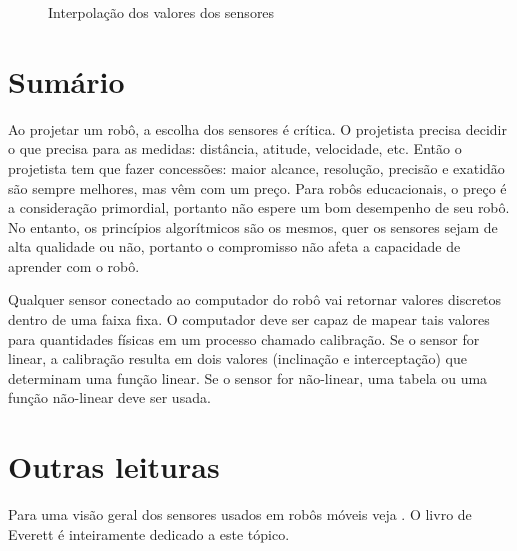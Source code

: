 \begin{figure}
\begin{center}
\caption{Interpolação dos valores dos sensores}\label{fig.interpolation}
\end{center}
\end{figure}

\section{Sumário}

Ao projetar um robô, a escolha dos sensores é crítica. O projetista precisa decidir o que precisa para as medidas: distância, atitude, velocidade, etc. Então o projetista tem que fazer concessões: maior alcance, resolução, precisão e exatidão são sempre melhores, mas vêm com um preço. Para robôs educacionais, o preço é a consideração primordial, portanto não espere um bom desempenho de seu robô. No entanto, os princípios algorítmicos são os mesmos, quer os sensores sejam de alta qualidade ou não, portanto o compromisso não afeta a capacidade de aprender com o robô.

Qualquer sensor conectado ao computador do robô vai retornar valores discretos dentro de uma faixa fixa. O computador deve ser capaz de mapear tais valores para quantidades físicas em um processo chamado calibração. Se o sensor for linear, a calibração resulta em dois valores (inclinação e interceptação) que determinam uma função linear. Se o sensor for não-linear, uma tabela ou uma função não-linear deve ser usada.


\section{Outras leituras}

Para uma visão geral dos sensores usados em robôs móveis veja \cite[seção 4.1]{siegwart}. O livro de Everett \cite{everett} é inteiramente dedicado a este tópico.

